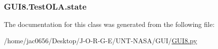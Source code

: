 \subsubsection[{\texorpdfstring{state}{state}}]{\setlength{\rightskip}{0pt plus 5cm}G\+U\+I8.\+Test\+O\+L\+A.\+state\hspace{0.3cm}{\ttfamily [static]}}\hypertarget{classGUI8_1_1TestOLA_a3556c0e8e96c798ffa4534bc266a815f}{}\label{classGUI8_1_1TestOLA_a3556c0e8e96c798ffa4534bc266a815f}


The documentation for this class was generated from the following file\+:\begin{DoxyCompactItemize}
\item 
/home/jac0656/\+Desktop/\+J-\/\+O-\/\+R-\/\+G-\/\+E/\+U\+N\+T-\/\+N\+A\+S\+A/\+G\+U\+I/\hyperlink{GUI8_8py}{G\+U\+I8.\+py}\end{DoxyCompactItemize}
